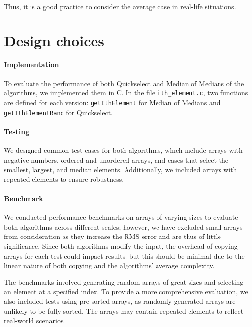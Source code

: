 \documentclass[paper=a4, fontsize=12pt]{scrartcl}
\numberwithin{equation}{section}
\numberwithin{figure}{section}
\numberwithin{table}{section}
\begin{document}
    Thus, it is a good practice to consider the average case in real-life situations.

    \section{Design choices}
    \paragraph{Implementation}
    To evaluate the performance of both Quickselect and Median of Medians of the algorithms, we implemented them in C.
    In the file \texttt{ith\_element.c}, two functions are defined for each version: \texttt{getIthElement} for Median of Medians and \texttt{getIthElementRand} for Quickselect. 

    \paragraph{Testing}
    We designed common test cases for both algorithms, which include arrays with negative numbers, ordered and unordered arrays, and cases that select the smallest, largest, and median elements.
    Additionally, we included arrays with repeated elements to ensure robustness.

    \paragraph{Benchmark}
    We conducted performance benchmarks on arrays of varying sizes to evaluate both algorithms across different scales; however, we have excluded small arrays from consideration as they increase the RMS error and are thus of little significance.
    Since both algorithms modify the input, the overhead of copying arrays for each test could impact results, but this should be minimal due to the linear nature of both copying and the algorithms' average complexity.

    The benchmarks involved generating random arrays of great sizes and selecting an element at a specified index. 
    To provide a more comprehensive evaluation, we also included tests using pre-sorted arrays, as randomly generated arrays are unlikely to be fully sorted. 
    The arrays may contain repeated elements to reflect real-world scenarios.
\end{document}
